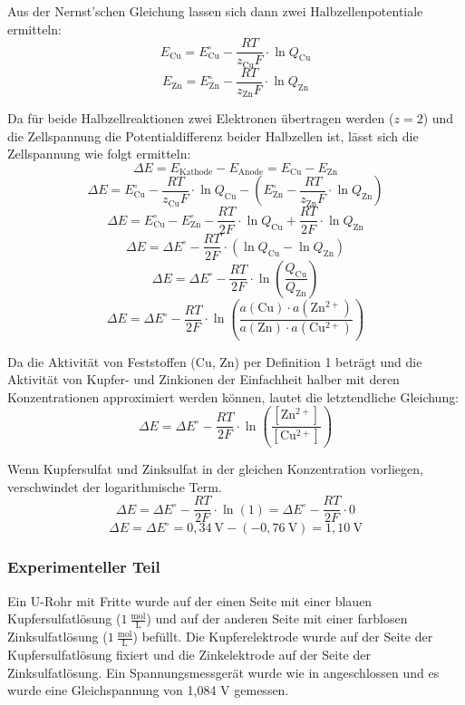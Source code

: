 \documentclass[
	a4paper,										%
	12pt,											%
	twoside,										%
	headsepline,								%
	footsepline,									%
	captions=tableheading,					%
]{scrartcl}
\newcommand{\formel}[2]{				%
	\begin{equation}
		\label{eq: #1}							%
		#2											%
	\end{equation}}
\begin{document}
	Aus der Nernst'schen Gleichung  lassen sich dann zwei Halbzellenpotentiale ermitteln:
	\formel{Cu1}{E_{\mathrm{Cu}} = E^{\circ}_{\mathrm{Cu}} - \frac{RT}{z_{\mathrm{Cu}}F} \cdot \ln Q_{\mathrm{Cu}}}
	\formel{Zn1}{E_{\mathrm{Zn}} = E^{\circ}_{\mathrm{Zn}} - \frac{RT}{z_{\mathrm{Zn}}F} \cdot \ln Q_{\mathrm{Zn}}}

	Da für beide Halbzellreaktionen zwei Elektronen übertragen werden ($z=2$) und die Zellspannung die Potentialdifferenz beider Halbzellen ist, lässt sich die Zellspannung wie folgt ermitteln:
	\formel{E3}{\Delta E = E_{\mathrm{Kathode}} - E_{\mathrm{Anode}} = E_{\mathrm{Cu}} - E_{\mathrm{Zn}}}
	\formel{E4}{\Delta E = E^{\circ}_{\mathrm{Cu}} - \frac{RT}{z_{\mathrm{Cu}}F} \cdot \ln Q_{\mathrm{Cu}} - (E^{\circ}_{\mathrm{Zn}} - \frac{RT}{z_{\mathrm{Zn}}F} \cdot \ln Q_{\mathrm{Zn}})}
	\formel{E5}{\Delta E = E^{\circ}_{\mathrm{Cu}} - E^{\circ}_{\mathrm{Zn}} - \frac{RT}{2F} \cdot \ln Q_{\mathrm{Cu}} + \frac{RT}{2F} \cdot \ln Q_{\mathrm{Zn}}}
	\formel{E6}{\Delta E = \Delta E^{\circ} - \frac{RT}{2F} \cdot (\ln Q_{\mathrm{Cu}} - \ln Q_{\mathrm{Zn}})}
	\formel{E7}{\Delta E = \Delta E^{\circ} - \frac{RT}{2F} \cdot \ln (\frac{Q_{\mathrm{Cu}}}{Q_{\mathrm{Zn}}})}
	\formel{E8}{\Delta E = \Delta E^{\circ} - \frac{RT}{2F} \cdot \ln (\frac{a(\mathrm{Cu}) \cdot a(\mathrm{Zn^{2+}})}{a(\mathrm{Zn}) \cdot a(\mathrm{Cu^{2+}})})}%

	Da die Aktivität von Feststoffen (Cu, Zn) per Definition 1 beträgt und die Aktivität von Kupfer- und Zinkionen der Einfachheit halber mit deren Konzentrationen approximiert werden können,
	lautet die letztendliche Gleichung:
	\formel{E9}{\Delta E = \Delta E^{\circ} - \frac{RT}{2F} \cdot \ln (\frac{[\mathrm{Zn^{2+}}]}{[\mathrm{Cu^{2+}}]})}

	Wenn Kupfersulfat und Zinksulfat in der gleichen Konzentration vorliegen, verschwindet der logarithmische Term.
	\formel{E10}{\Delta E = \Delta E^{\circ} - \frac{RT}{2F} \cdot \ln (1) = \Delta E^{\circ} - \frac{RT}{2F} \cdot 0}
	\formel{E11}{\Delta E = \Delta E^{\circ} = 0,34\ \mathrm{V} - (-0,76\ \mathrm{V}) = 1,10\ \mathrm{V}}

\subsubsection{Experimenteller Teil}

	Ein U-Rohr mit Fritte wurde auf der einen Seite mit einer blauen Kupfersulfatlösung ($1\ \mathrm{\frac{mol}{L}}$) und auf der anderen Seite mit einer farblosen Zinksulfatlösung ($1\ \mathrm{\frac{mol}{L}}$) befüllt.
	Die Kupferelektrode wurde auf der Seite der Kupfersulfatlösung fixiert und die Zinkelektrode auf der Seite der Zinksulfatlösung.
	Ein Spannungsmessgerät wurde wie in  angeschlossen und es wurde eine Gleichspannung von 1,084 V gemessen.
\end{document}
